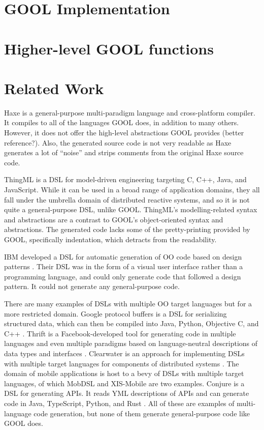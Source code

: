 \documentclass[sigplan,review,anonymous]{acmart}\settopmatter{printfolios=true,printccs=false,printacmref=false}
\begin{document}
\section{GOOL Implementation} \label{implementation}
\section{Higher-level GOOL functions} \label{patterns}
\section{Related Work} \label{related}
Haxe is a general-purpose multi-paradigm language and cross-platform compiler. 
It compiles to all of the languages GOOL does, in addition to many others. 
However, it does not offer the high-level abstractions GOOL provides 
\cite{Haxe} (better reference?). Also, the generated source code is not very 
readable as Haxe generates a lot of ``noise'' and strips comments from the 
original Haxe source code.

ThingML \cite{harrand2016thingml} is a DSL for model-driven engineering 
targeting C, C++, Java, and 
JavaScript. While it can be used in a broad range of application domains, they 
all fall under the umbrella domain of distributed reactive systems, and so it 
is not quite a general-purpose DSL, unlike GOOL. ThingML's modelling-related 
syntax and abstractions are a contrast to GOOL's object-oriented syntax and 
abstractions. The generated code lacks some of the pretty-printing provided by 
GOOL, specifically indentation, which detracts from the readability.

IBM developed a DSL for automatic generation of OO code based on design 
patterns \cite{budinsky1996automatic}. Their DSL was in the form of a visual 
user interface rather than a programming language, and could only generate code 
that followed a design pattern. It could not generate any general-purpose code.

There are many examples of DSLs with multiple OO target languages but for a 
more restricted domain. Google protocol buffers is a DSL for serializing 
structured data, which can then be compiled into Java, Python, Objective C, and 
C++ \cite{Protobuf}. Thrift is a Facebook-developed tool for generating code in 
multiple languages and even multiple paradigms based on language-neutral 
descriptions of data types and interfaces \cite{slee2007thrift}. Clearwater is 
an approach for implementing DSLs with multiple target languages for components 
of distributed systems \cite{swint2005clearwater}. The domain of mobile 
applications is host to a bevy of DSLs with multiple target languages, of which 
MobDSL \cite{kramer2010mobdsl} and XIS-Mobile \cite{ribeiro2014xis} are two 
examples. Conjure is a DSL for generating APIs. It reads YML descriptions of 
APIs and can generate code in Java, TypeScript, Python, and Rust 
\cite{Conjure}. All of these are examples of multi-language code generation, 
but none of them generate general-purpose code like GOOL does.
\end{document}
